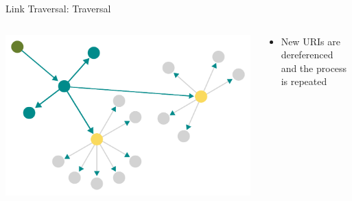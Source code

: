 \begin{frame}{Link Traversal: Traversal}
    \begin{columns}[T] %
        \begin{column}{0.6\textwidth} %
            \includegraphics[width=\linewidth]{images/showing-link-traversal-step-2.pdf} %
        \end{column}

        \begin{column}{0.4\textwidth} %
            \begin{itemize}
                \item New URIs are dereferenced and the process is repeated
            \end{itemize}
        \end{column}
    \end{columns}
\end{frame}



